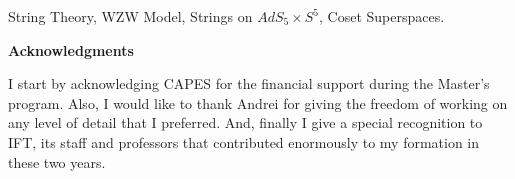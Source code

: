 \documentclass[a4paper,12pt]{article}
\numberwithin{equation}{section}
\numberwithin{thm}{section}
\numberwithin{exm}{section}
\newcommand{\ads}{{AdS_5\times S^5}}
\newcommand{\<}{{\langle}}
\renewcommand{\>}{{\rangle}}
\begin{document}
\vspace{4cm}

 String Theory, WZW Model, Strings on $\ads$, Coset Superspaces.


%
%
%
%
%


\newpage

\begin{center}
{\bf\Large Acknowledgments}
\end{center}

I start by acknowledging CAPES for the financial support during the Master's program. Also, I would like to thank Andrei for giving the freedom of working on any level of detail that I preferred. And, finally I give a special recognition to IFT, its staff and professors that contributed enormously to my formation in these two years.

%
%
%
\end{document}

